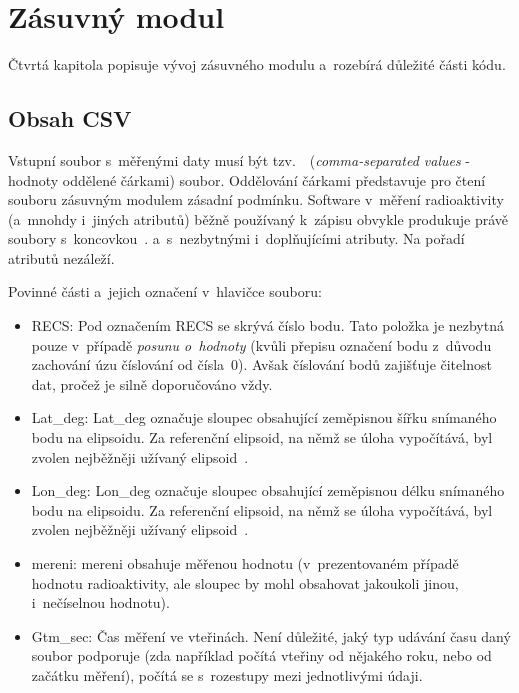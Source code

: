 \chapter{Zásuvný modul}
\label{4-plugin}

Čtvrtá kapitola popisuje vývoj zásuvného modulu a~rozebírá důležité části kódu. 


\section{Obsah CSV}
\label{obsah}

Vstupní soubor s~měřenými daty musí být tzv.~~(\textit{comma-separated values} - hodnoty oddělené
čárkami) soubor. Oddělování čárkami představuje pro čtení souboru zásuvným modulem zásadní podmínku.
Software v~měření radioaktivity (a~mnohdy i~jiných atributů) běžně používaný k~zápisu obvykle
produkuje právě soubory s~koncovkou~. a~s~nezbytnými i~doplňujícími atributy. Na pořadí
atributů nezáleží. 

Povinné části a~jejich označení v~hlavičce souboru: 
\begin{itemize}

	\item RECS: Pod označením RECS se skrývá číslo bodu. Tato položka je nezbytná pouze
	v~případě \textit{posunu o~hodnoty} (kvůli přepisu označení bodu z~důvodu zachování úzu číslování
	od čísla~0). Avšak číslování bodů zajišťuje čitelnost dat, pročež je silně doporučováno vždy. 
	
	\item Lat\_deg: Lat\_deg označuje sloupec obsahující zeměpisnou šířku snímaného bodu na elipsoidu.
	Za referenční elipsoid, na němž se úloha vypočítává, byl zvolen nejběžněji užívaný
	elipsoid~. 
	
	\item Lon\_deg: Lon\_deg označuje sloupec obsahující zeměpisnou délku snímaného bodu na elipsoidu.
	Za referenční elipsoid, na němž se úloha vypočítává, byl zvolen nejběžněji užívaný
	elipsoid~. 
	
	\item mereni: mereni obsahuje měřenou hodnotu (v~prezentovaném případě hodnotu radioaktivity, ale
	sloupec by mohl obsahovat jakoukoli jinou, i~nečíselnou hodnotu). 
	
	\item Gtm\_sec: Čas měření ve vteřinách. Není důležité, jaký typ udávání času daný soubor
	podporuje (zda například počítá vteřiny od nějakého roku, nebo od začátku měření), počítá
	se s~rozestupy mezi jednotlivými údaji. 

\end{itemize}

